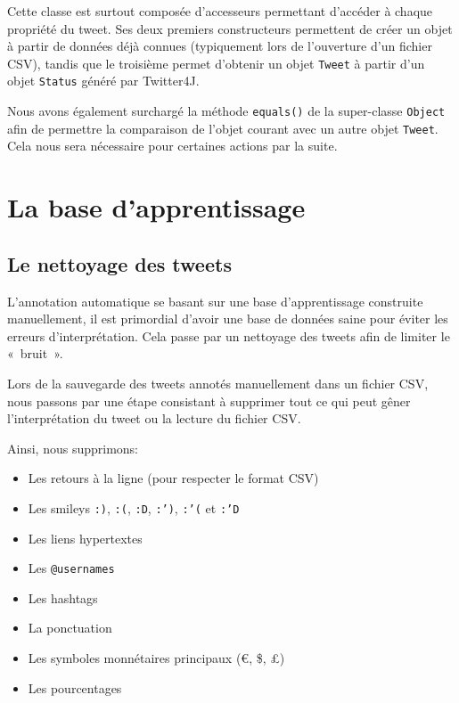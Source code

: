 \documentclass[12pt,a4paper]{report}
\begin{document}
Cette classe est surtout composée d'accesseurs permettant d'accéder à chaque
propriété du tweet. Ses deux premiers constructeurs permettent de créer un objet
à partir de données déjà connues (typiquement lors de l'ouverture d'un fichier
CSV), tandis que le troisième permet d'obtenir un objet \texttt{Tweet} à partir
d'un objet \texttt{Status} généré par Twitter4J.

Nous avons également surchargé la méthode \texttt{equals()} de la super-classe
\texttt{Object} afin de permettre la comparaison de l'objet courant avec un
autre objet \texttt{Tweet}. Cela nous sera nécessaire pour certaines actions par
la suite.



\chapter{La base d'apprentissage}

\section{Le nettoyage des tweets}

L'annotation automatique se basant sur une base d'apprentissage construite
manuellement, il est primordial d'avoir une base de données saine pour éviter
les erreurs d'interprétation. Cela passe par un nettoyage des tweets afin de
limiter le «~bruit~».

Lors de la sauvegarde des tweets annotés manuellement dans un fichier CSV, nous
passons par une étape consistant à supprimer tout ce qui peut gêner
l'interprétation du tweet ou la lecture du fichier CSV.

Ainsi, nous supprimons:

\begin{itemize}
	\item
		Les retours à la ligne (pour respecter le format CSV)
	\item
		Les smileys \texttt{:)}, \texttt{:(}, \texttt{:D}, \texttt{:')},
		\texttt{:'(} et \texttt{:'D}
	\item
		Les liens hypertextes
	\item
		Les \texttt{@usernames}
	\item
		Les hashtags
	\item
		La ponctuation
	\item
		Les symboles monnétaires principaux (\euro, \$, £)
	\item
		Les pourcentages
\end{itemize}
\end{document}
